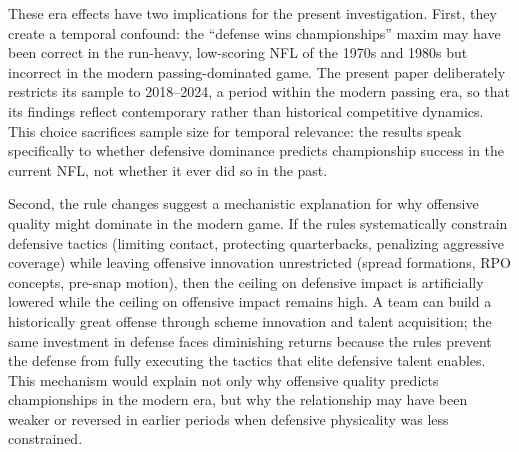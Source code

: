 These era effects have two implications for the present investigation. First, they create a temporal confound: the ``defense wins championships'' maxim may have been correct in the run-heavy, low-scoring NFL of the 1970s and 1980s but incorrect in the modern passing-dominated game. The present paper deliberately restricts its sample to 2018--2024, a period within the modern passing era, so that its findings reflect contemporary rather than historical competitive dynamics. This choice sacrifices sample size for temporal relevance: the results speak specifically to whether defensive dominance predicts championship success in the current NFL, not whether it ever did so in the past.

Second, the rule changes suggest a mechanistic explanation for why offensive quality might dominate in the modern game. If the rules systematically constrain defensive tactics (limiting contact, protecting quarterbacks, penalizing aggressive coverage) while leaving offensive innovation unrestricted (spread formations, RPO concepts, pre-snap motion), then the ceiling on defensive impact is artificially lowered while the ceiling on offensive impact remains high. A team can build a historically great offense through scheme innovation and talent acquisition; the same investment in defense faces diminishing returns because the rules prevent the defense from fully executing the tactics that elite defensive talent enables. This mechanism would explain not only why offensive quality predicts championships in the modern era, but why the relationship may have been weaker or reversed in earlier periods when defensive physicality was less constrained.
